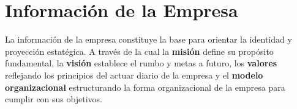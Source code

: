 \section*{Información de la Empresa}
La información de la empresa constituye la base para orientar la identidad y proyección estatégica. A través de la cual la \textbf{misión} define su propósito fundamental, la \textbf{visión} establece el rumbo y metas a futuro, los \textbf{valores} reflejando los principios del actuar diario de la empresa y el \textbf{modelo organizacional} estructurando la forma organizacional de la empresa para cumplir con sus objetivos.







